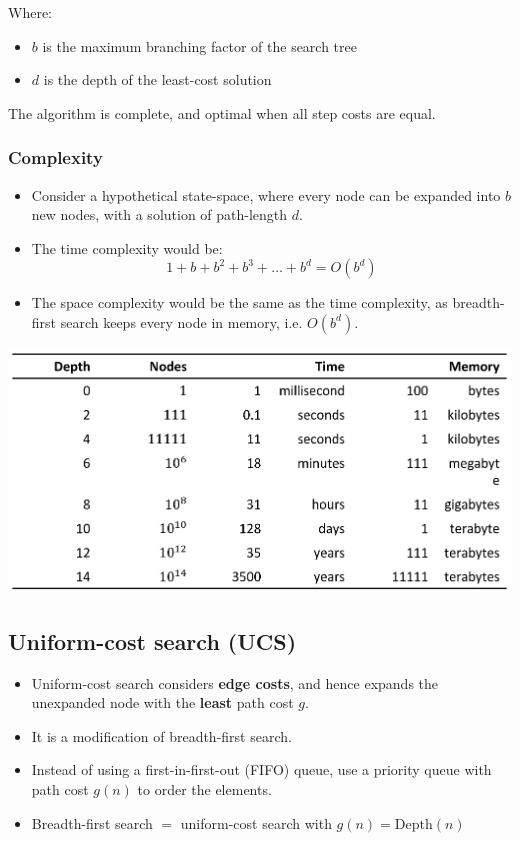 \documentclass[11pt]{article}
\begin{document}
Where:
\begin{itemize}
\item \(b\) is the maximum branching factor of the search tree
\item \(d\) is the depth of the least-cost solution
\end{itemize}

The algorithm is complete, and optimal when all step costs are equal.
\subsubsection{Complexity}
\label{sec:org3055aa0}
\begin{itemize}
\item Consider a hypothetical state-space, where every node can be expanded into \(b\) new nodes, with a solution of path-length \(d\).
\item The time complexity would be:
\[1 + b + b^2 + b^3 + \ldots + b^d = O(b^d)\]
\item The space complexity would be the same as the time complexity, as breadth-first search keeps every node in memory, i.e. \(O(b^d)\).
\end{itemize}

\begin{center}
\includegraphics[width=.9\linewidth]{./images/time-and-space-complexity-of-breadth-first-search.png}
\end{center}
\subsection{Uniform-cost search (UCS)}
\label{sec:org27d9b16}
\begin{itemize}
\item Uniform-cost search considers \textbf{edge costs}, and hence expands the unexpanded node with the \textbf{least} path cost \(g\).
\item It is a modification of breadth-first search.
\item Instead of using a first-in-first-out (FIFO) queue, use a priority queue with path cost \(g(n)\) to order the elements.
\item Breadth-first search \(=\) uniform-cost search with \(g(n) = \text{Depth}(n)\)
\end{itemize}
\end{document}
